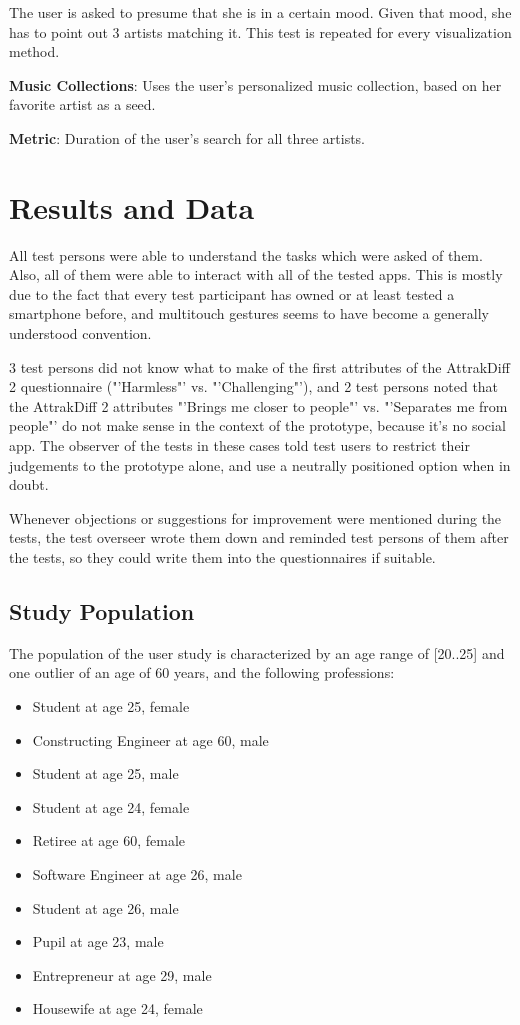 The user is asked to presume that she is in a certain mood. Given that mood, she has to point out 3 artists matching it. This test is repeated for every visualization method.
	
\textbf{Music Collections}: Uses the user's personalized music collection, based on her favorite artist as a seed.
	
\textbf{Metric}: Duration of the user's search for all three artists.


\section{Results and Data}

All test persons were able to understand the tasks which were asked of them. Also, all of them were able to interact with all of the tested apps. This is mostly due to the fact that every test participant has owned or at least tested a smartphone before, and multitouch gestures seems to have become a generally understood convention.

3 test persons did not know what to make of the first attributes of the AttrakDiff 2 questionnaire ("'Harmless"' vs. "'Challenging"'), and 2 test persons noted that the AttrakDiff 2 attributes "'Brings me closer to people"' vs. "'Separates me from people"' do not make sense in the context of the prototype, because it's no social app. The observer of the tests in these cases told test users to restrict their judgements to the prototype alone, and use a neutrally positioned option when in doubt.

Whenever objections or suggestions for improvement were mentioned during the tests, the test overseer wrote them down and reminded test persons of them after the tests, so they could write them into the questionnaires if suitable.

\subsection{Study Population}

The population of the user study is characterized by an age range of [20..25] and one outlier of an age of 60 years, and the following professions:

\begin{itemize}
	\item Student at age 25, female
	\item Constructing Engineer at age 60, male
	\item Student at age 25, male
	\item Student at age 24, female
	\item Retiree at age 60, female
	\item Software Engineer at age 26, male
	\item Student at age 26, male
	\item Pupil at age 23, male
	\item Entrepreneur at age 29, male
	\item Housewife at age 24, female
\end{itemize}

